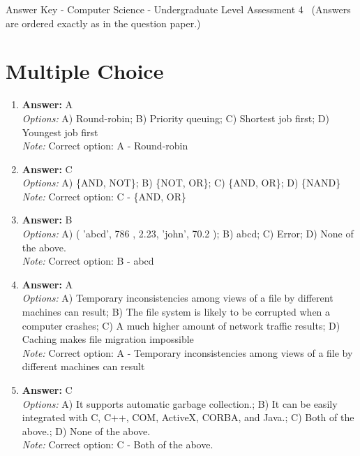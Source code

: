 \documentclass[12pt]{article}
\begin{document}
\begin{center}
Answer Key - Computer Science - Undergraduate Level Assessment 4 \
\small (Answers are ordered exactly as in the question paper.)
\end{center}

\section*{Multiple Choice}
\begin{enumerate}[label=\arabic*.]
\item \textbf{Answer:} A
\\ \textit{Options:} A) Round-robin; B) Priority queuing; C) Shortest job first; D) Youngest job first
\\ \textit{Note:} Correct option: A - Round-robin
\item \textbf{Answer:} C
\\ \textit{Options:} A) \{AND, NOT\}; B) \{NOT, OR\}; C) \{AND, OR\}; D) \{NAND\}
\\ \textit{Note:} Correct option: C - \{AND, OR\}
\item \textbf{Answer:} B
\\ \textit{Options:} A) ( 'abcd', 786 , 2.23, 'john', 70.2 ); B) abcd; C) Error; D) None of the above.
\\ \textit{Note:} Correct option: B - abcd
\item \textbf{Answer:} A
\\ \textit{Options:} A) Temporary inconsistencies among views of a file by different machines can result; B) The file system is likely to be corrupted when a computer crashes; C) A much higher amount of network traffic results; D) Caching makes file migration impossible
\\ \textit{Note:} Correct option: A - Temporary inconsistencies among views of a file by different machines can result
\item \textbf{Answer:} C
\\ \textit{Options:} A) It supports automatic garbage collection.; B) It can be easily integrated with C, C++, COM, ActiveX, CORBA, and Java.; C) Both of the above.; D) None of the above.
\\ \textit{Note:} Correct option: C - Both of the above.
\end{enumerate}
\end{document}
